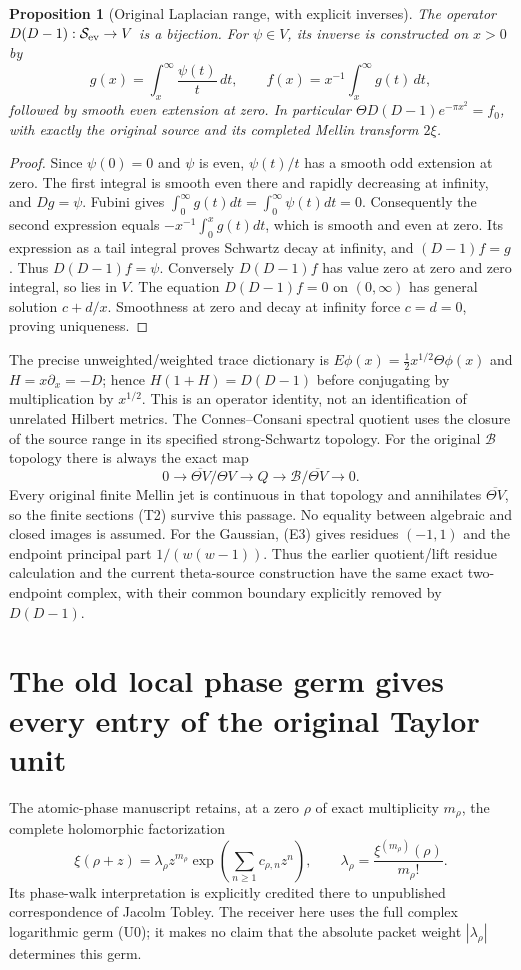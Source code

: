 \documentclass[11pt]{article}
\newtheorem{proposition}[theorem]{Proposition}
\newcommand{\B}{\mathscr B}\newcommand{\M}{\mathcal M}
\begin{document}
\begin{proposition}[Original Laplacian range, with explicit inverses]
The operator $D(D-1):\mathcal S_{\rm ev}\to V$ is a bijection.
For $\psi\in V$, its inverse is constructed on $x>0$ by
\[
 g(x)=\int_x^\infty\frac{\psi(t)}t\,dt,
 \qquad f(x)=x^{-1}\int_x^\infty g(t)\,dt,
 \tag{E4}
\]
followed by smooth even extension at zero. In particular
$\Theta D(D-1)e^{-\pi x^2}=f_0$, with exactly the original source
and its completed Mellin transform $2\xi$.
\end{proposition}
\begin{proof}
Since $\psi(0)=0$ and $\psi$ is even, $\psi(t)/t$ has a smooth odd
extension at zero. The first integral is smooth even there and rapidly
decreasing at infinity, and $Dg=\psi$. Fubini gives
$\int_0^\infty g(t)dt=\int_0^\infty\psi(t)dt=0$.
Consequently the second expression equals
$-x^{-1}\int_0^xg(t)dt$, which is smooth and even at zero.
Its expression as a tail integral proves Schwartz decay at infinity,
and $(D-1)f=g$. Thus $D(D-1)f=\psi$.
Conversely $D(D-1)f$ has value zero at zero and zero integral, so lies
in $V$. The equation $D(D-1)f=0$ on $(0,\infty)$ has general solution
$c+d/x$. Smoothness at zero and decay at infinity force $c=d=0$,
proving uniqueness.
\end{proof}

The precise unweighted/weighted trace dictionary is
$E\phi(x)=\tfrac12 x^{1/2}\Theta\phi(x)$ and
$H=x\partial_x=-D$; hence $H(1+H)=D(D-1)$ before conjugating
by multiplication by $x^{1/2}$. This is an operator identity, not an
identification of unrelated Hilbert metrics. The Connes--Consani spectral
quotient uses the closure of the source range in its specified
strong-Schwartz topology. For the original $\B$ topology there is always
the exact map
\[
 0\to\overline{\Theta V}/\Theta V\to Q
       \to\B/\overline{\Theta V}\to0.\tag{E5}
\]
Every original finite Mellin jet is continuous in that topology and
annihilates $\overline{\Theta V}$, so the finite sections (T2) survive
this passage. No equality between algebraic and closed images is assumed.
For the Gaussian, (E3) gives residues $(-1,1)$ and the endpoint principal
part $1/(w(w-1))$. Thus the earlier quotient/lift residue calculation
and the current theta-source construction have the same exact two-endpoint
complex, with their common boundary explicitly removed by $D(D-1)$.

\section{The old local phase germ gives every entry of the original Taylor unit}
The atomic-phase manuscript retains, at a zero $\rho$ of exact multiplicity
$m_\rho$, the complete holomorphic factorization
\[
 \xi(\rho+z)=\lambda_\rho z^{m_\rho}
       \exp\!\left(\sum_{n\geq1}c_{\rho,n}z^n\right),\qquad
 \lambda_\rho=\frac{\xi^{(m_\rho)}(\rho)}{m_\rho!}.
 \tag{U0}
\]
Its phase-walk interpretation is explicitly credited there to unpublished
correspondence of Jacolm Tobley. The receiver here uses the full complex
logarithmic germ (U0); it makes no claim that the absolute packet weight
$|\lambda_\rho|$ determines this germ.
\end{document}
